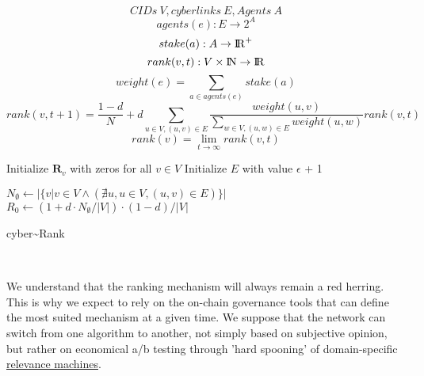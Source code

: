 \documentclass[8pt,oneside]{amsart}
\begin{document}
$$ CIDs \ V, cyberlinks \ E, Agents \ A $$
$$agents(e): E \rightarrow 2^{A}$$
$$stake(a): A \rightarrow {\rm I\!R}^+ $$
$$rank(v, t): V \times {\rm I\!N} \rightarrow {\rm I\!R} $$
$$weight(e) = \sum\limits_{a \in agents(e)}{stake(a)}$$
$$rank(v, t + 1) = \frac{1 - d}{N} + d\sum\limits_{u \in V, (u, v) \in E}{\frac{weight(u, v)}{\sum_{w \in V, (u, w) \in E}{weight(u, w)}}rank(v, t)} $$
$$rank(v) = \lim\limits_{t \rightarrow \infty} rank(v, t)$$
\begin{algorithm}


\BlankLine
Initialize $\textbf{R}_{v}$ with zeros for all $v \in V$\;
Initialize $E$ with value $\epsilon$ + 1\;

\BlankLine
$N_{\emptyset} \leftarrow |\{v|v \in V \land (\nexists u, u \in V, (u, v) \in E )\}|$ \;
$R_{0} \leftarrow (1 + d \cdot N_{\emptyset} / |V|) \cdot (1 - d) / |V| $ \;

\BlankLine
{}

\caption{cyber\~{}Rank}\label{algo_disjdecomp}
\end{algorithm}\

We understand that the ranking mechanism will always remain a red herring. This is why we expect to rely on the on-chain governance tools that can define the most suited mechanism at a given time. We suppose that the network can switch from one algorithm to another, not simply based on subjective opinion, but rather on economical a/b testing through 'hard spooning' of domain-specific {\hyperref[relevance-machine]{relevance machines}}.
\end{document}
